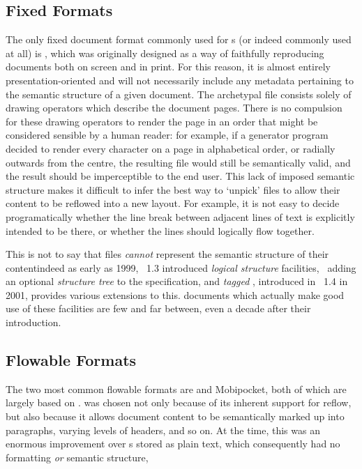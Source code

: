 \subsection{Fixed Formats}
The only fixed document format commonly used for \ebook{}s (or indeed commonly used at all) is \pdf{}, which was originally designed as a way of faithfully reproducing documents both on screen and in print. For this reason, it is almost entirely pre\-s\-en\-ta\-tion-oriented and will not necessarily include any metadata pertaining to the semantic structure of a given document. The archetypal \pdf{} file consists solely of drawing operators which describe the document pages. There is no compulsion for these drawing operators to render the page in an order that might be considered sensible by a human reader: for example, if a \pdf{} generator program decided to render every character on a page in alphabetical order, or radially outwards from the centre, the resulting file would still be semantically valid, and the result should be imperceptible to the end user. This lack of imposed semantic structure makes it difficult to infer the best way to `unpick' \pdf{} files to allow their content to be reflowed into a new layout. For example, it is not easy to decide programatically whether the line break between adjacent lines of text is explicitly intended to be there, or whether the lines should logically flow together.

This is not to say that \pdf{} files \emph{cannot} represent the semantic structure of their content\ed indeed as early as 1999, \pdf{}~1.3 introduced \emph{logical structure} facilities,~\cite{Adobe2001} adding an optional \emph{structure tree} to the \pdf{} specification, and \emph{tagged \pdf{}}, introduced in \pdf{}~1.4 in 2001, provides various extensions to this. \pdf{} documents which actually make good use of these facilities are few and far between, even a decade after their introduction.



\subsection{Flowable Formats}
\label{sec:flowableformat}
The two most common flowable \ebook{} formats are \epub{} and Mobipocket, both of which are largely based on \html{}. \html{} was chosen not only because of its inherent support for reflow, but also because it allows document content to be semantically marked up into paragraphs, varying levels of headers, and so on. At the time, this was an enormous improvement over \ebook{}s stored as plain text, which consequently had no formatting \emph{or} semantic structure, 

